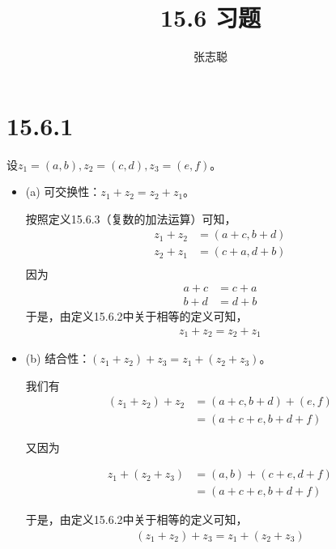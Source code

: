 \documentclass{article}
\begin{document}
\title{15.6 习题}
\author{张志聪}
\maketitle

\section*{15.6.1}

设$z_1 = (a, b), z_2 = (c, d), z_3 = (e, f)$。

\begin{itemize}
  \item (a) 可交换性：$z_1 + z_2 = z_2 + z_1$。

        按照定义15.6.3（复数的加法运算）可知，
        \begin{align*}
          z_1 + z_2 & = (a + c, b + d) \\
          z_2 + z_1 & = (c + a, d + b) \\
        \end{align*}
        因为
        \begin{align*}
          a + c & = c + a \\
          b + d & = d + b
        \end{align*}
        于是，由定义15.6.2中关于相等的定义可知，
        \begin{align*}
          z_1 + z_2 = z_2 + z_1
        \end{align*}

  \item (b) 结合性：$(z_1 + z_2) + z_3 = z_1 + (z_2 + z_3)$。

        我们有
        \begin{align*}
          (z_1 + z_2) + z_2 & = (a + c, b + d) + (e, f) \\
                            & = (a + c + e, b + d + f)
        \end{align*}

        又因为

        \begin{align*}
          z_1 + (z_2 + z_3) & = (a, b) + (c + e, d + f) \\
                            & = (a + c + e, b + d + f)
        \end{align*}

        于是，由定义15.6.2中关于相等的定义可知，
        \begin{align*}
          (z_1 + z_2) + z_3 = z_1 + (z_2 + z_3)
        \end{align*}


\end{itemize}
\end{document}
